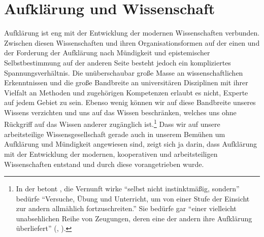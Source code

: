 \section{Aufklärung und Wissenschaft}\label{Abschnitt:EpistemischeArbeitsteilung}
Aufklärung ist eng mit der Entwicklung der modernen Wissenschaften verbunden.
Zwischen diesen Wissenschaften und ihren Organisationsformen auf der einen und der
Forderung der Aufklärung nach Mündigkeit und epistemischer Selbstbestimmung auf
der anderen Seite besteht jedoch ein kompliziertes Spannungsverhältnis. Die
unüberschaubar große Masse an wissenschaftlichen Erkenntnissen und die große
Bandbreite an universitären Disziplinen mit ihrer Vielfalt an Methoden und
zugehörigen Kompetenzen erlaubt es nicht, Experte auf jedem Gebiet zu sein.
Ebenso wenig können wir auf diese Bandbreite unseres Wissens verzichten
und uns auf das Wissen beschränken, welches uns ohne Rückgriff auf das
Wissen anderer zugänglich ist.\footnote{In der  betont
, die Vernunft wirke \enquote{selbst nicht instinktmäßig,
sondern} bedürfe \enquote{Versuche, Übung und Unterricht, um von einer Stufe der
Einsicht zur andern allmählich fortzuschreiten.} Sie bedürfe gar \enquote{einer
vielleicht unabsehlichen Reihe von Zeugungen, deren eine der andern ihre
Aufklärung überliefert} \mkbibparens{\cite[][A
389]{Kant:IdeezueinerallgemeinenGeschichteinweltbuergerlicherAbsicht1977},
\cite[][VIII: 19.7--8]{Kant:GesammelteWerke1900ff.}}.} Dass wir auf unsere
arbeitsteilige Wissensgesellschaft gerade auch in unserem Bemühen um Aufklärung und Mündigkeit
angewiesen sind, zeigt sich ja darin, dass Aufklärung mit der Entwicklung der
modernen, kooperativen und arbeitsteiligen Wissenschaften entstand und durch
diese vorangetrieben wurde.


